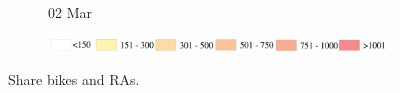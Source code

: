 \documentclass[ijgi,submit,moreauthors,pdftex]{Definitions/mdpi}
\begin{document}
\begin{figure}[H]
\begin{subfigure}{.3\textwidth}
    \end{subfigure}
    \begin{subfigure}{.3\textwidth}
        \caption{02 Mar}
    \end{subfigure}

    \vspace{6pt}
    \begin{subfigure}{.7\textwidth}
        \includegraphics[width=\textwidth]{Figures/AppendixLegend2-eps-converted-to.pdf}
    \end{subfigure}
    \caption{Share bikes and RAs.}
    \label{fig:BSS_communities}
\end{figure}
\end{document}
